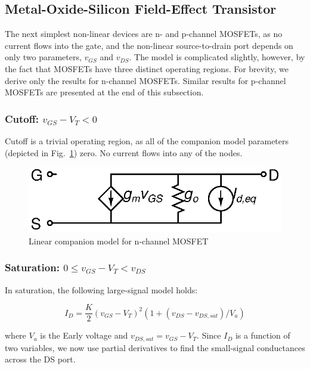 \documentclass{article}
\begin{document}
\pagebreak

\subsection{Metal-Oxide-Silicon Field-Effect Transistor}

The next simplest non-linear devices are n- and p-channel MOSFETs, as no current flows into the gate, and the non-linear source-to-drain port depends on only two parameters, $v_{GS}$ and $v_{DS}$.   The model is complicated slightly, however, by the fact that MOSFETs have three distinct operating regions.  For brevity, we derive only the results for n-channel MOSFETs.  Similar results for p-channel MOSFETs are presented at the end of this subsection.

\subsubsection{Cutoff: $ v_{GS} - V_T < 0 $ }

Cutoff is a trivial operating region, as all of the companion model parameters (depicted in Fig.~\ref{fig:nmos}) zero.  No current flows into any of the nodes.

\begin{figure}[h]
\begin{center}
\includegraphics{fig/nmos.eps}
\caption{Linear companion model for n-channel MOSFET \label{fig:nmos}}
\end{center}
\end{figure}

\subsubsection{Saturation: $ 0 \leq v_{GS} - V_T < v_{DS} $}

In saturation, the following large-signal model holds:

\begin{equation}
I_D=\frac{K}{2}(v_{GS}-V_T)^2 (1+(v_{DS}-v_{DS,sat})/V_a)
\end{equation}

where $V_a$ is the Early voltage and  $v_{DS,sat}=v_{GS}-V_T$.  Since $I_D$ is a function of two variables, we now use partial derivatives to find the small-signal conductances across the DS port.
\end{document}
